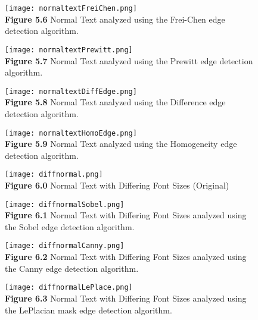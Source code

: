 \documentclass{article}%
\begin{document}
\newpage
\begin{figure}[h]
\centering
\texttt{[image: normaltextFreiChen.png]}\\
{\bf Figure 5.6} Normal Text analyzed using the Frei-Chen edge detection algorithm.  
\end{figure}

\newpage
\begin{figure}[h]
\centering
\texttt{[image: normaltextPrewitt.png]}\\
{\bf Figure 5.7} Normal Text analyzed using the Prewitt edge detection algorithm.  
\end{figure}

\newpage
\begin{figure}[h]
\centering
\texttt{[image: normaltextDiffEdge.png]}\\
{\bf Figure 5.8} Normal Text analyzed using the Difference edge detection algorithm.  
\end{figure}

\newpage
\begin{figure}[h]
\centering
\texttt{[image: normaltextHomoEdge.png]}\\
{\bf Figure 5.9} Normal Text analyzed using the Homogeneity edge detection algorithm.  
\end{figure}

\clearpage


\newpage
\begin{figure}[h]
\centering
\texttt{[image: diffnormal.png]}\\
{\bf Figure 6.0} Normal Text with Differing Font Sizes (Original)
\end{figure}

\newpage
\begin{figure}[h]
\centering
\texttt{[image: diffnormalSobel.png]}\\
{\bf Figure 6.1} Normal Text with Differing Font Sizes analyzed using the Sobel edge detection algorithm.   
\end{figure}

\newpage
\begin{figure}[h]
\centering
\texttt{[image: diffnormalCanny.png]}\\
{\bf Figure 6.2} Normal Text with Differing Font Sizes analyzed using the Canny edge detection algorithm.   
\end{figure}

\newpage
\begin{figure}[h]
\centering
\texttt{[image: diffnormalLePlace.png]}\\
{\bf Figure 6.3} Normal Text with Differing Font Sizes analyzed using the LePlacian mask edge detection algorithm.  
\end{figure}
\end{document}

